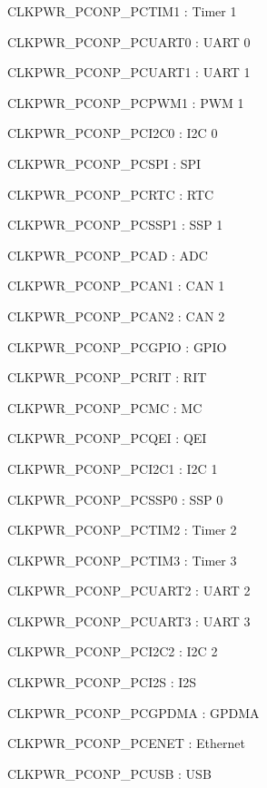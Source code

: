 \begin{DoxyItemize}
\item C\+L\+K\+P\+W\+R\+\_\+\+P\+C\+O\+N\+P\+\_\+\+P\+C\+T\+I\+M1 \+: Timer 1
\item C\+L\+K\+P\+W\+R\+\_\+\+P\+C\+O\+N\+P\+\_\+\+P\+C\+U\+A\+R\+T0 \+: U\+A\+RT 0
\item C\+L\+K\+P\+W\+R\+\_\+\+P\+C\+O\+N\+P\+\_\+\+P\+C\+U\+A\+R\+T1 \+: U\+A\+RT 1
\item C\+L\+K\+P\+W\+R\+\_\+\+P\+C\+O\+N\+P\+\_\+\+P\+C\+P\+W\+M1 \+: P\+WM 1
\item C\+L\+K\+P\+W\+R\+\_\+\+P\+C\+O\+N\+P\+\_\+\+P\+C\+I2\+C0 \+: I2C 0
\item C\+L\+K\+P\+W\+R\+\_\+\+P\+C\+O\+N\+P\+\_\+\+P\+C\+S\+PI \+: S\+PI
\item C\+L\+K\+P\+W\+R\+\_\+\+P\+C\+O\+N\+P\+\_\+\+P\+C\+R\+TC \+: R\+TC
\item C\+L\+K\+P\+W\+R\+\_\+\+P\+C\+O\+N\+P\+\_\+\+P\+C\+S\+S\+P1 \+: S\+SP 1
\item C\+L\+K\+P\+W\+R\+\_\+\+P\+C\+O\+N\+P\+\_\+\+P\+C\+AD \+: A\+DC
\item C\+L\+K\+P\+W\+R\+\_\+\+P\+C\+O\+N\+P\+\_\+\+P\+C\+A\+N1 \+: C\+AN 1
\item C\+L\+K\+P\+W\+R\+\_\+\+P\+C\+O\+N\+P\+\_\+\+P\+C\+A\+N2 \+: C\+AN 2
\item C\+L\+K\+P\+W\+R\+\_\+\+P\+C\+O\+N\+P\+\_\+\+P\+C\+G\+P\+IO \+: G\+P\+IO
\item C\+L\+K\+P\+W\+R\+\_\+\+P\+C\+O\+N\+P\+\_\+\+P\+C\+R\+IT \+: R\+IT
\item C\+L\+K\+P\+W\+R\+\_\+\+P\+C\+O\+N\+P\+\_\+\+P\+C\+MC \+: MC
\item C\+L\+K\+P\+W\+R\+\_\+\+P\+C\+O\+N\+P\+\_\+\+P\+C\+Q\+EI \+: Q\+EI
\item C\+L\+K\+P\+W\+R\+\_\+\+P\+C\+O\+N\+P\+\_\+\+P\+C\+I2\+C1 \+: I2C 1
\item C\+L\+K\+P\+W\+R\+\_\+\+P\+C\+O\+N\+P\+\_\+\+P\+C\+S\+S\+P0 \+: S\+SP 0
\item C\+L\+K\+P\+W\+R\+\_\+\+P\+C\+O\+N\+P\+\_\+\+P\+C\+T\+I\+M2 \+: Timer 2
\item C\+L\+K\+P\+W\+R\+\_\+\+P\+C\+O\+N\+P\+\_\+\+P\+C\+T\+I\+M3 \+: Timer 3
\item C\+L\+K\+P\+W\+R\+\_\+\+P\+C\+O\+N\+P\+\_\+\+P\+C\+U\+A\+R\+T2 \+: U\+A\+RT 2
\item C\+L\+K\+P\+W\+R\+\_\+\+P\+C\+O\+N\+P\+\_\+\+P\+C\+U\+A\+R\+T3 \+: U\+A\+RT 3
\item C\+L\+K\+P\+W\+R\+\_\+\+P\+C\+O\+N\+P\+\_\+\+P\+C\+I2\+C2 \+: I2C 2
\item C\+L\+K\+P\+W\+R\+\_\+\+P\+C\+O\+N\+P\+\_\+\+P\+C\+I2S \+: I2S
\item C\+L\+K\+P\+W\+R\+\_\+\+P\+C\+O\+N\+P\+\_\+\+P\+C\+G\+P\+D\+MA \+: G\+P\+D\+MA
\item C\+L\+K\+P\+W\+R\+\_\+\+P\+C\+O\+N\+P\+\_\+\+P\+C\+E\+N\+ET \+: Ethernet
\item C\+L\+K\+P\+W\+R\+\_\+\+P\+C\+O\+N\+P\+\_\+\+P\+C\+U\+SB \+: U\+SB
\end{DoxyItemize}


